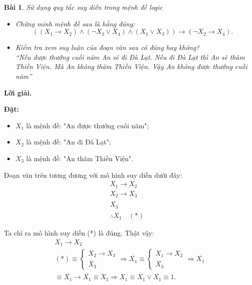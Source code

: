 \documentclass[11pt, oneside,openright,a4paper]{book}
\newtheorem{bt}{Bài }[section]
\begin{document}
\begin{bt}
 Sử dụng quy tắc suy diễn trong mệnh đề logic
    \begin{itemize}
     \item[a)] Chứng minh mệnh đề sau là hằng đúng: 
           $$((X_1 \rightarrow X_2) \land (\lnot X_3 \lor X_4) \land (X_1 \lor X_3)) \rightarrow (\lnot X_2 \rightarrow X_4).$$
        \item[b)] Kiểm tra xem suy luận của đoạn văn sau có đúng hay không?\\
        ``Nếu được thưởng cuối năm An sẽ đi Đà Lạt. Nếu đi Đà Lạt thì An sẽ thăm Thiền Viện. Mà An không thăm Thiền Viện. Vậy An không được thưởng cuối năm''
    \end{itemize}          
\end{bt}
{\bf Lời giải.} 

\textbf{Đặt:}
\begin{itemize}
  \item $X_1$ là mệnh đề: "An được thưởng cuối năm";
  \item $X_2$ là mệnh đề: "An đi Đà Lạt";
  \item $X_3$ là mệnh đề: "An thăm Thiền Viện".
\end{itemize}

Đoạn văn trên tương đương với mô hình suy diễn dưới đây:
\[
\begin{array}{c}
X_1 \rightarrow X_2 \\
X_2 \rightarrow X_3 \\
\overline{X_3} \\
\hline
\therefore \overline{X_1} \quad (*)
\end{array}
\]

Ta chỉ ra mô hình suy diễn (*) là đúng. Thật vậy:
\[
\begin{aligned}
&X_1 \rightarrow X_2 \\
&(*) \equiv 
\left\{
\begin{array}{l}
X_2 \rightarrow X_3 \\
\overline{X_3}
\end{array}
\right.
\Rightarrow \overline{X_1} \equiv
\left\{
\begin{array}{l}
X_1 \rightarrow X_2 \\
\overline{X_3}
\end{array}
\right.
\Rightarrow \overline{X_1} \\
&\equiv \overline{X_1} \rightarrow \overline{X_1} \equiv X_1 \Rightarrow X_1 \equiv X_1 \vee \overline{X_1} \equiv 1.
\end{aligned}
\]
\end{document}
